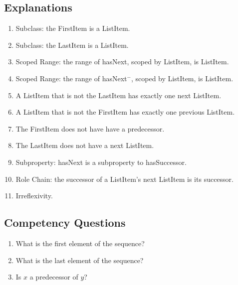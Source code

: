 \subsection{Explanations}
\label{exp:Sequence}
\begin{enumerate}
\item Subclass: the \textsf{FirstItem} is a \textsf{ListItem}.
\item Subclass: the \textsf{LastItem} is a \textsf{ListItem}.
\item Scoped Range: the range of \textsf{hasNext}, scoped by \textsf{ListItem}, is \textsf{ListItem}.
\item Scoped Range: the range of \textsf{hasNext}$^-$, scoped by \textsf{ListItem}, is \textsf{ListItem}.
\item A \textsf{ListItem} that is not the \textsf{LastItem} has exactly one next \textsf{ListItem}.
\item A \textsf{ListItem} that is not the \textsf{FirstItem} has exactly one previous \textsf{ListItem}.
\item The \textsf{FirstItem} does not have have a predecessor.
\item The \textsf{LastItem} does not have a next \textsf{ListItem}.
\item Subproperty: \textsf{hasNext} is a subproperty to \textsf{hasSuccessor}.
\item Role Chain: the successor of a \textsf{ListItem}'s next \textsf{ListItem} is its successor.
\item Irreflexivity.
\end{enumerate}

\subsection{Competency Questions}
\label{cqs:Sequence}
\begin{enumerate}[CQ1.]
\item What is the first element of the sequence?
\item What is the last element of the sequence?
\item Is $x$ a predecessor of $y$?
\end{enumerate}

\newpage
